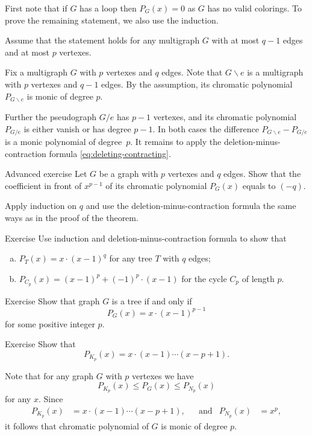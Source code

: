 First note that if $G$ has a loop then $P_G(x)=0$ as $G$ has no valid colorings.
To prove the remaining statement, we also use the induction.

Assume that the statement holds for any multigraph $G$ with at most $q-1$ edges and at most $p$ vertexes.

Fix a multigraph $G$ with $p$ vertexes and $q$ edges.
Note that $G\backslash e$ is a multigraph with $p$ vertexes and $q-1$ edges.
By the assumption, its chromatic polynomial $P_{G\backslash e}$ is monic of degree $p$.

Further the pseudograph $G/e$ has $p-1$ vertexes,
and its chromatic polynomial $P_{G/e}$ is either vanish or has degree $p-1$.
In both cases the difference $P_{G\backslash e}-P_{G/e}$ is a monic polynomial of degree~$p$.
It remains to apply the deletion-minus-contraction formula \ref{eq:deleting-contracting}.
\qedsf

\begin{thm}{Advanced exercise}
Let $G$ be a graph with $p$ vertexes and $q$ edges.
Show that the coefficient in front of $x^{p-1}$ of its chromatic polynomial $P_G(x)$ equals to $(-q)$.
\end{thm}

 Apply induction on $q$ and use the deletion-minus-contraction formula the same ways as in the proof of the theorem.

\begin{thm}{Exercise}
Use induction and  deletion-minus-contraction formula to show that 
\begin{enumerate}[(a)]
\item $P_{T}(x)=x\cdot(x-1)^q$ for any tree $T$ with $q$ edges;
\item $P_{C_p}(x)=(x-1)^p+(-1)^p\cdot(x-1)$ for the cycle $C_p$ of length $p$.
\end{enumerate}
\end{thm}


\begin{thm}{Exercise} Show that graph $G$ is a tree if and only if \[P_G(x)= x\cdot(x-1)^{p-1}\] for some positive integer $p$.
\end{thm}

\begin{thm}{Exercise}\label{ex:chrom(K_p)}
Show that 
\[P_{K_p}(x)=x\cdot(x-1)\cdots(x-p+1).\]

\end{thm}

Note that for any graph $G$ with $p$ vertexes we have
\[P_{K_p}(x)\le P_G(x)\le P_{N_p}(x)\]
for any $x$.
Since 
\begin{align*}
P_{K_p}(x)&=x\cdot(x-1)\cdots(x-p+1),&&
\text{and}
&
P_{N_p}(x)&=x^p,
\end{align*}
it follows that chromatic polynomial of $G$ is monic of degree $p$.

